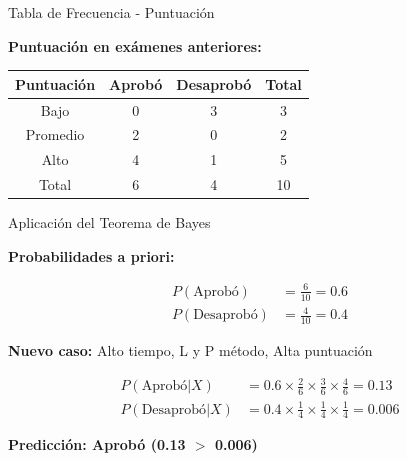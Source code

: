 \documentclass{beamer}
\begin{document}
\begin{frame}{Tabla de Frecuencia - Puntuación}
    \begin{center}
        \textbf{Puntuación en exámenes anteriores:}
        
        \vspace{0.5cm}
        
        \begin{tabular}{cccc}
            \toprule
            Puntuación & Aprobó & Desaprobó & Total \\
            \midrule
            Bajo & 0 & 3 & 3 \\
            Promedio & 2 & 0 & 2 \\
            Alto & 4 & 1 & 5 \\
            \midrule
            Total & 6 & 4 & 10 \\
            \bottomrule
        \end{tabular}
    \end{center}
\end{frame}

\begin{frame}{Aplicación del Teorema de Bayes}
    \begin{center}
        \textbf{Probabilidades a priori:}
        
        \begin{align*}
        P(\text{Aprobó}) &= \frac{6}{10} = 0.6 \\
        P(\text{Desaprobó}) &= \frac{4}{10} = 0.4
        \end{align*}
        
        \textbf{Nuevo caso:} Alto tiempo, L y P método, Alta puntuación
        
        \begin{align*}
        P(\text{Aprobó}|X) &= 0.6 \times \frac{2}{6} \times \frac{3}{6} \times \frac{4}{6} = 0.13 \\
        P(\text{Desaprobó}|X) &= 0.4 \times \frac{1}{4} \times \frac{1}{4} \times \frac{1}{4} = 0.006
        \end{align*}
        
        \Large{\textbf{Predicción: Aprobó (0.13 $>$ 0.006)}}
    \end{center}
\end{frame}
\end{document}
